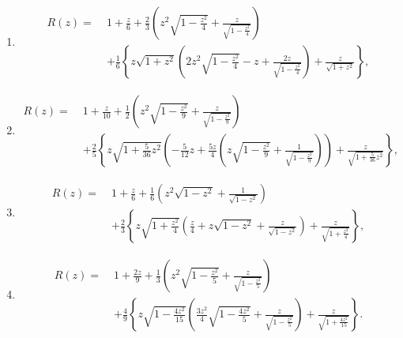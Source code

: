 \documentclass[a4paper, preprint,11pt]{elsarticle}
\numberwithin{equation}{section}
\begin{document}
\begin{enumerate} [label=\Roman*.]
    \item 
    \begin{equation*}
      \begin{aligned}
       R(z) =\; & 1 + \frac{z}{6} 
       + \frac{2}{3}\left( z^2 \sqrt{1-\frac{z^2}{4}} + \frac{z}{\sqrt{1-\frac{z^2}{4}}} \right) \\
       & + \frac{1}{6} \left\{z\sqrt{1+z^2} \left( 2z^2\sqrt{1- \frac{z^2}{4}} - z + \frac{2z}{\sqrt{1 - \frac{z^2}{4}}} \right) + \frac{z}{\sqrt{1+z^2}} \right\},
       \end{aligned}
    \end{equation*}
      \item
      \begin{equation*}
        \begin{aligned}
     R(z) =\; & 1 + \frac{z}{10} 
      + \frac{1}{2}\left( z^2 \sqrt{1-\frac{z^2}{9}} + \frac{z}{\sqrt{1-\frac{z^2}{9}}} \right) \\
      & + \frac{2}{5} \left\{z\sqrt{1+\frac{5}{36}z^2} \left( -\frac{5}{12}z + \frac{5z}{4}\left(z\sqrt{1 - \frac{z^2}{9}} + \frac{1}{\sqrt{1-\frac{z^2}{9}}}\right) \right) + \frac{z}{\sqrt{1+\frac{5}{36}z^2}} \right\},
         \end{aligned}
       \end{equation*}
\item \begin{equation*}
\begin{aligned}
R(z) =\; & 1 + \frac{z}{6} 
+ \frac{1}{6}\left( z^2 \sqrt{1-z^2} + \frac{1}{\sqrt{1-z^2}} \right) \\
& + \frac{2}{3} \left\{z\sqrt{1+\frac{z^2}{4}} \left( \frac{z}{4} + z\sqrt{1 - z^2} + \frac{z}{\sqrt{1-z^2}} \right) + \frac{z}{\sqrt{1+\frac{z^2}{4}}} \right\},
\end{aligned}
\end{equation*}
\item
\begin{equation*}
\begin{aligned}
R(z) =\; & 1 + \frac{2z}{9} 
+ \frac{1}{3}\left( z^2 \sqrt{1-\frac{z^2}{5}} + \frac{z}{\sqrt{1-\frac{z^2}{5}}} \right) \\
& + \frac{4}{9} \left\{z\sqrt{1-\frac{4z^2}{15}} \left( \frac{3z^2}{4} \sqrt{1 - \frac{4z^2}{5}} + \frac{z}{\sqrt{1-\frac{z^2}{5}}} \right) + \frac{z}{\sqrt{1+\frac{4z^2}{15}}}\right\}.
\end{aligned}
\end{equation*}
\end{enumerate}
\end{document}

